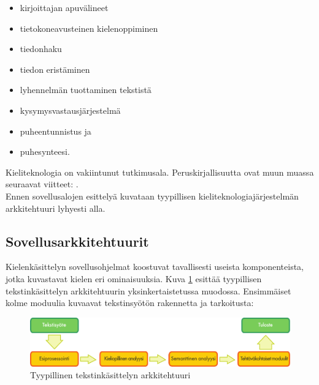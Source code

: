 \begin{multicols}{2}
\begin{itemize}
\item kirjoittajan apuvälineet

\item tietokoneavusteinen kielenoppiminen

\item tiedonhaku

\item tiedon eristäminen

\item lyhennelmän tuottaminen tekstistä

\item kysymysvastausjärjestelmä

\item puheentunnistus ja

\item puhesynteesi.
\end{itemize}

Kieliteknologia on vakiintunut tutkimusala. Peruskirjallisuutta ovat
muun muassa seuraavat viitteet: \cite{carstensen-etal1,
  jurafsky-martin01, manning-schuetze1, lt-world1, lt-survey1}.\\
Ennen sovellusalojen esittelyä kuvataan tyypillisen
kieliteknologiajärjestelmän arkkitehtuuri lyhyesti alla.


\subsection{Sovellusarkkitehtuurit}


Kielenkäsittelyn sovellusohjelmat koostuvat tavallisesti useista
komponenteista, jotka kuvastavat kielen eri ominaisuuksia. Kuva
\ref{fig:textprocessingarch-fin} esittää tyypillisen tekstinkäsittelyn
arkkitehtuurin yksinkertaistetussa muodossa. Ensimmäiset kolme
moduulia kuvaavat tekstinsyötön rakennetta ja tarkoitusta:

\begin{figure}[b]
  \center
  \includegraphics[width=\textwidth]{../_media/finnish/text_processing_app_architecture}
  \caption{Tyypillinen tekstinkäsittelyn arkkitehtuuri}
  \label{fig:textprocessingarch-fin}
\end{figure}


\end{multicols}
